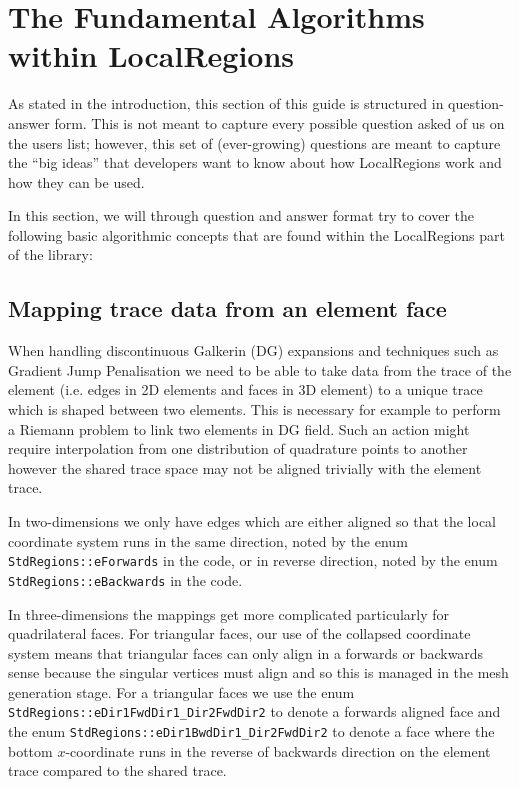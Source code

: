 %
\section{The Fundamental Algorithms within LocalRegions}

As stated in the introduction, this section of this guide is
structured in question-answer form.  This is not meant to capture
every possible question asked of us on the {\nek} users list; however,
this set of (ever-growing) questions are meant to capture the ``big
ideas'' that developers want to know about how LocalRegions work and
how they can be used.

In this section, we will through question and answer format try to
cover the following basic algorithmic concepts that are found within
the LocalRegions part of the library:

\subsection{Mapping trace data from an element face}

When handling discontinuous Galkerin (DG) expansions and techniques
such as Gradient Jump Penalisation we need to be able to take data
from the trace of the element (i.e. edges in 2D elements and faces in
3D element) to a unique trace which is shaped between two
elements. This is necessary for example to perform a Riemann problem
to link two elements in DG field. Such an action might require
interpolation from one distribution of quadrature points to another
however the shared trace space may not be aligned trivially with the
element trace.

In two-dimensions we only have edges which are either aligned so that
the local coordinate system runs in the same direction, noted by the
enum \verb+StdRegions::eForwards+ in the code, or in reverse
direction, noted by the enum \verb+StdRegions::eBackwards+ in the
code.

In three-dimensions the mappings get more complicated particularly for
quadrilateral faces. For triangular faces, our use of the collapsed
coordinate system means that triangular faces can only align in a
forwards or backwards sense because the singular vertices must align
and so this is managed in the mesh generation stage. For a triangular
faces we use the enum \verb+StdRegions::eDir1FwdDir1_Dir2FwdDir2+ to
denote a forwards aligned face and the enum
\verb+StdRegions::eDir1BwdDir1_Dir2FwdDir2+ to denote a face where
the bottom $x$-coordinate runs in the reverse of backwards direction
on the element trace compared to the shared trace.

